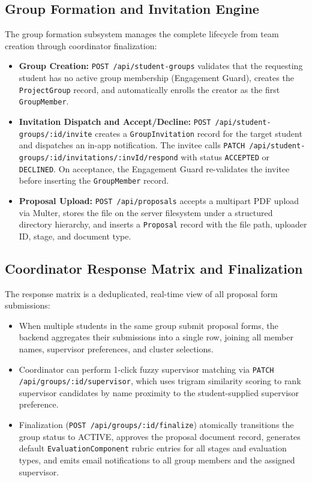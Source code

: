\subsection{Group Formation and Invitation Engine}
The group formation subsystem manages the complete lifecycle from team creation through coordinator finalization:
\begin{itemize}
    \item \textbf{Group Creation:} \texttt{POST /api/student-groups} validates that the requesting student has no active group membership (Engagement Guard), creates the \texttt{ProjectGroup} record, and automatically enrolls the creator as the first \texttt{GroupMember}.
    \item \textbf{Invitation Dispatch and Accept/Decline:} \texttt{POST /api/student-groups/:id/invite} creates a \texttt{GroupInvitation} record for the target student and dispatches an in-app notification. The invitee calls \texttt{PATCH /api/student-groups/:id/invitations/:invId/respond} with status \texttt{ACCEPTED} or \texttt{DECLINED}. On acceptance, the Engagement Guard re-validates the invitee before inserting the \texttt{GroupMember} record.
    \item \textbf{Proposal Upload:} \texttt{POST /api/proposals} accepts a multipart PDF upload via Multer, stores the file on the server filesystem under a structured directory hierarchy, and inserts a \texttt{Proposal} record with the file path, uploader ID, stage, and document type.
\end{itemize}

\subsection{Coordinator Response Matrix and Finalization}
The response matrix is a deduplicated, real-time view of all proposal form submissions:
\begin{itemize}
    \item When multiple students in the same group submit proposal forms, the backend aggregates their submissions into a single row, joining all member names, supervisor preferences, and cluster selections.
    \item Coordinator can perform 1-click fuzzy supervisor matching via \texttt{PATCH /api/groups/:id/supervisor}, which uses trigram similarity scoring to rank supervisor candidates by name proximity to the student-supplied supervisor preference.
    \item Finalization (\texttt{POST /api/groups/:id/finalize}) atomically transitions the group status to ACTIVE, approves the proposal document record, generates default \texttt{EvaluationComponent} rubric entries for all stages and evaluation types, and emits email notifications to all group members and the assigned supervisor.
\end{itemize}

